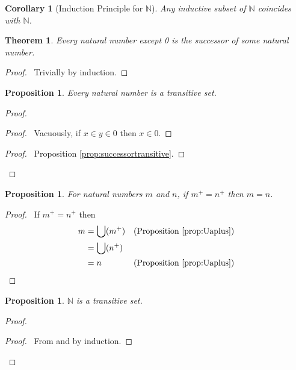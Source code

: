 \documentclass{book}
\let\qed\relax
\newtheorem{prop}[ax]{Proposition}
\newtheorem{cor}{Corollary}[ax]
\newtheorem{thm}[ax]{Theorem}
\theoremstyle{definition}
\begin{document}
\begin{cor}[Induction Principle for $\mathbb{N}$]
Any inductive subset of $\mathbb{N}$ coincides with $\mathbb{N}$.
\end{cor}

\begin{thm}
\label{thm:zeroorsucc}
Every natural number except 0 is the successor of some natural number.
\end{thm}

\begin{proof}
\pf\ Trivially by induction. \qed
\end{proof}

\begin{prop}
\label{prop:nattrans}
Every natural number is a transitive set.
\end{prop}

\begin{proof}
\pf
{}
\begin{proof}
	\pf\ Vacuously, if $x \in y \in 0$ then $x \in 0$.
\end{proof}
\begin{proof}
	\pf\ Proposition \ref{prop:successortransitive}.
\end{proof}
\qed
\end{proof}

\begin{prop}
\label{prop:Peano2}
For natural numbers $m$ and $n$, if $m^+ = n^+$ then $m = n$.
\end{prop}

\begin{proof}
	\pf\ If $m^+ = n^+$ then
	\begin{align*}
		m & = \bigcup (m^+) & (\text{Proposition \ref{prop:Uaplus}}) \\
		& = \bigcup (n^+) \\
		& = n & (\text{Proposition \ref{prop:Uaplus}})
	\end{align*}
\end{proof}
\begin{prop}
$\mathbb{N}$ is a transitive set.
\end{prop}

\begin{proof}
\pf
{}
\begin{proof}
	\pf\ From  and  by induction.
\end{proof}
\qed
\end{proof}
\end{document}

